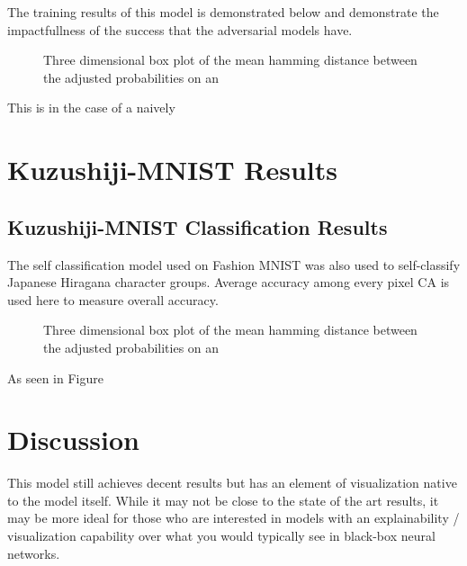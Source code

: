 \documentclass[conference]{IEEEtran}
\begin{document}
The training results of this model is demonstrated below and demonstrate the impactfullness of the success that the adversarial models have.

\begin{figure}[htbp]
\caption{Three dimensional box plot of the mean hamming distance between the adjusted probabilities on an }
\end{figure}

This is in the case of a naively

\section{Kuzushiji-MNIST Results}

\subsection{Kuzushiji-MNIST Classification Results}

The self classification model used on Fashion MNIST was also used to self-classify Japanese Hiragana character groups. Average accuracy among every pixel CA is used here to measure overall accuracy. 

\begin{figure}[htbp]
\centering{\texttt{[image: ]}}
\caption{Three dimensional box plot of the mean hamming distance between the adjusted probabilities on an }
\end{figure}

As seen in Figure 

\section{Discussion}

This model still achieves decent results but has an element of visualization native to the model itself. While it may not be close to the state of the art results, it may be more ideal for those who are interested in models with an explainability / visualization capability over what you would typically see in black-box neural networks. 
\end{document}
